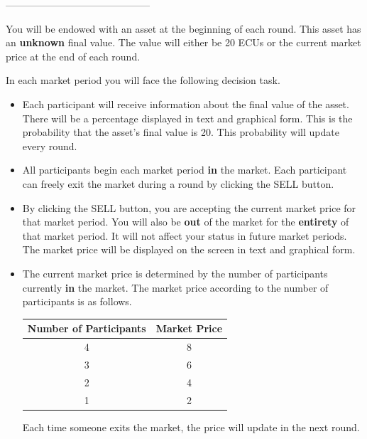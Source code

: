 \documentclass[11pt]{article}
\begin{document}
\vspace{0.2in}
\begin{center}
--------------------------------------------
\end{center}
\vspace{0.2in}


You will be endowed with an asset at the beginning of each round. This asset has an \textbf{unknown} final value. The value will either be 20 ECUs or the current market price at the end of each round.

\vspace{0.2in}

In each market period you will face the following decision task.

\begin{itemize}

    \item Each participant will receive information about the final value of the asset. There will be a percentage displayed in text and graphical form. This is the probability that the asset's final value is 20. This probability will update every round.

    \item All participants begin each market period \textbf{in} the market. Each participant can freely exit the market during a round by clicking the SELL button.

    \item By clicking the SELL button, you are accepting the current market price for that market period. You will also be \textbf{out} of the market for the \textbf{entirety} of that market period. It will not affect your status in future market periods. The market price will be displayed on the screen in text and graphical form.

    \item The current market price is determined by the number of participants currently \textbf{in} the market. The market price according to the number of participants is as follows.\\
    \begin{center}
    \begin{tabular}{|c|c|}
        \hline
        \textbf{Number of Participants} & \textbf{Market Price} \\
        \hline
        4 & 8 \\
        3 & 6 \\
        2 & 4 \\
        1 & 2 \\
        \hline
    \end{tabular}
    \end{center}
    Each time someone exits the market, the price will update in the next round.


\end{itemize}
\end{document}
